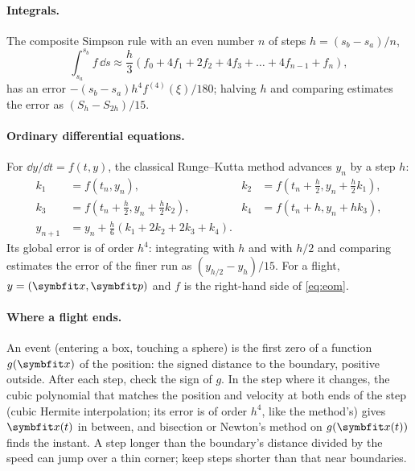 \documentclass{leveldoc}
\begin{document}
\paragraph{Integrals.} The composite Simpson rule with an even number $n$ of steps
$h = (s_b-s_a)/n$,
\begin{equation}\label{eq:simpson}
  \int_{s_a}^{s_b} f\,\dd s \approx \frac{h}{3}\left(f_0 + 4f_1 + 2f_2 + 4f_3 + \dots + 4f_{n-1} + f_n\right),
\end{equation}
has an error $-(s_b-s_a)h^4 f^{(4)}(\xi)/180$; halving $h$ and comparing estimates the error as
$(S_h - S_{2h})/15$.

\paragraph{Ordinary differential equations.} For $\dd y/\dd t = f(t,y)$, the classical
Runge--Kutta method advances $y_n$ by a step $h$:
\begin{equation}\label{eq:rk4}
  \begin{aligned}
    k_1 &= f(t_n, y_n), &
    k_2 &= f\!\left(t_n + \tfrac{h}{2}, y_n + \tfrac{h}{2}k_1\right), \\
    k_3 &= f\!\left(t_n + \tfrac{h}{2}, y_n + \tfrac{h}{2}k_2\right), &
    k_4 &= f(t_n + h, y_n + hk_3), \\
    y_{n+1} &= y_n + \tfrac{h}{6}\left(k_1 + 2k_2 + 2k_3 + k_4\right). &&
  \end{aligned}
\end{equation}
Its global error is of order $h^4$: integrating with $h$ and with $h/2$ and comparing
estimates the error of the finer run as $(y_{h/2}-y_h)/15$. For a flight, $y = (\vect{x},\vect{p})$
and $f$ is the right-hand side of \eqref{eq:eom}.

\paragraph{Where a flight ends.} An event (entering a box, touching a sphere) is the first
zero of a function $g(\vect{x})$ of the position: the signed distance to the boundary,
positive outside. After each step, check the sign of $g$. In the step where it changes, the
cubic polynomial that matches the position and velocity at both ends of the step (cubic
Hermite interpolation; its error is of order $h^4$, like the method's) gives $\vect{x}(t)$ in
between, and bisection or Newton's method on $g(\vect{x}(t))$ finds the instant. A step longer
than the boundary's distance divided by the speed can jump over a thin corner; keep steps
shorter than that near boundaries.
\end{document}
